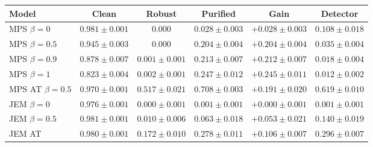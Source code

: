 \begin{tabular}{lccccc}
\toprule
Model & Clean & Robust & Purified & Gain & Detector \\
\midrule
MPS $\beta=0$ & $0.981 \pm 0.001$ & $0.000$ & $0.028 \pm 0.003$ & $+0.028 \pm 0.003$ & $0.108 \pm 0.018$ \\
MPS $\beta=0.5$ & $0.945 \pm 0.003$ & $0.000$ & $0.204 \pm 0.004$ & $+0.204 \pm 0.004$ & $0.035 \pm 0.004$ \\
MPS $\beta=0.9$ & $0.878 \pm 0.007$ & $0.001 \pm 0.001$ & $0.213 \pm 0.007$ & $+0.212 \pm 0.007$ & $0.018 \pm 0.004$ \\
MPS $\beta=1$ & $0.823 \pm 0.004$ & $0.002 \pm 0.001$ & $0.247 \pm 0.012$ & $\mathbf{+0.245 \pm 0.011}$ & $0.012 \pm 0.002$ \\
MPS AT $\beta=0.5$ & $0.970 \pm 0.001$ & $\mathbf{0.517 \pm 0.021}$ & $\mathbf{0.708 \pm 0.003}$ & $+0.191 \pm 0.020$ & $\mathbf{0.619 \pm 0.010}$ \\
JEM $\beta=0$ & $0.976 \pm 0.001$ & $0.000 \pm 0.001$ & $0.001 \pm 0.001$ & $+0.000 \pm 0.001$ & $0.001 \pm 0.001$ \\
JEM $\beta=0.5$ & $\mathbf{0.981 \pm 0.001}$ & $0.010 \pm 0.006$ & $0.063 \pm 0.018$ & $+0.053 \pm 0.021$ & $0.140 \pm 0.019$ \\
JEM AT & $0.980 \pm 0.001$ & $0.172 \pm 0.010$ & $0.278 \pm 0.011$ & $+0.106 \pm 0.007$ & $0.296 \pm 0.007$ \\
\bottomrule
\end{tabular}
